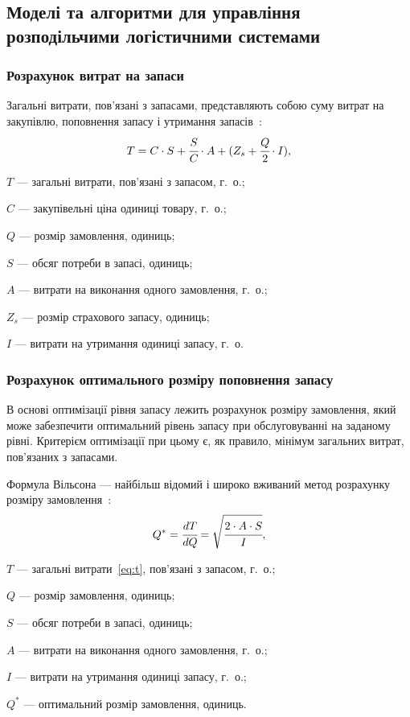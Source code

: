 \subsection{Моделі та алгоритми для управління розподільчими логістичними системами}
\subsubsection{Розрахунок витрат на запаси}
Загальні витрати, пов'язані з запасами, представляють собою суму витрат на закупівлю, поповнення запасу і утримання запасів~\cite{Sterligova2008}:
\begin{equation} \label{eq:t}
T=C\cdot S+\cfrac{S}{C}\cdot A+(Z_s+\cfrac{Q}{2}\cdot I)
,
\end{equation}
\begin{description}
	\item[де] $T$ --- загальні витрати, пов'язані з запасом, г.~о.;
	\item $C$ --- закупівельні ціна одиниці товару, г.~о.;
	\item $Q$ --- розмір замовлення, одиниць;
	\item $S$ --- обсяг потреби в запасі, одиниць;
	\item $A$ --- витрати на виконання одного замовлення, г.~о.;
	\item $Z_s$ --- розмір страхового запасу, одиниць;
	\item $I$ --- витрати на утримання одиниці запасу, г.~о.
\end{description}

\subsubsection{Розрахунок оптимального розміру поповнення запасу}
В основі оптимізації рівня запасу лежить розрахунок розміру замовлення, який може забезпечити оптимальний рівень запасу при обслуговуванні на заданому рівні.
Критерієм оптимізації при цьому є, як правило, мінімум загальних витрат, пов'язаних з запасами.

Формула Вільсона --- найбільш відомий і широко вживаний метод розрахунку розміру замовлення~\cite{Sterligova2008}:
\begin{equation}
Q^*=\cfrac{dT}{dQ}=\sqrt{\cfrac{2\cdot A\cdot S}{I}}
,
\end{equation}
\begin{description}
	\item[де] $T$ --- загальні витрати~\eqref{eq:t}, пов'язані з запасом, г.~о.;
	\item $Q$ --- розмір замовлення, одиниць;
	\item $S$ --- обсяг потреби в запасі, одиниць;
	\item $A$ --- витрати на виконання одного замовлення, г.~о.;
	\item $I$ --- витрати на утримання одиниці запасу, г.~о.;
	\item $Q^*$ --- оптимальний розмір замовлення, одиниць.
\end{description}

